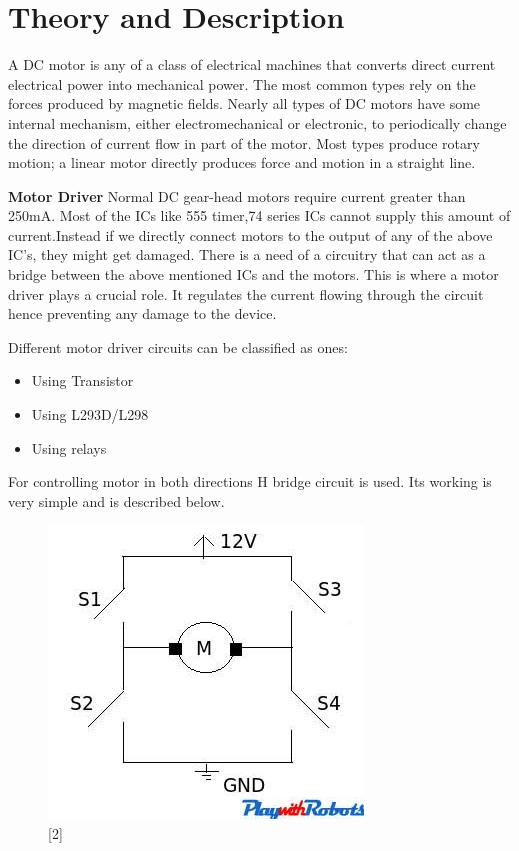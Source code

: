 \documentclass[11pt,a4paper]{article}
\begin{document}
	\newpage
	\section{Theory and Description}
	A DC motor is any of a class of electrical machines that converts direct current electrical power into mechanical power. The most common types rely on the forces produced by magnetic fields. Nearly all types of DC motors have some internal mechanism, either electromechanical or electronic, to periodically change the direction of current flow in part of the motor. Most types produce rotary motion; a linear motor directly produces force and motion in a straight line.
	
	\vspace{0.5cm}
	\flushleft
	\textbf{Motor Driver}
	\vspace{0.3cm}
	\newline
	Normal DC gear-head motors require current greater than 250mA. Most of the ICs like 555 timer,74 series ICs cannot supply this amount of current.Instead if we directly connect motors to the output of any of the above IC's, they might get damaged. There is a need of a circuitry that can act as a bridge between the above mentioned ICs and the motors. This is where a motor driver plays a crucial role. It regulates the current flowing through the circuit hence preventing any damage to the device.
	
	Different motor driver circuits can be classified as ones:
	\begin{itemize}
		\item Using Transistor
		\item Using L293D/L298
		\item Using relays
	\end{itemize}
    
    \newpage
    For controlling motor in both directions H bridge circuit is used. Its working is very simple and is described below.
    \begin{figure}[h!]
    	\includegraphics[scale=1]{hb.jpg}
    	\centering
    	\caption{[2]}
    \end{figure} 
    
\end{document}
